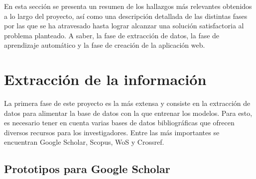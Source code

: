 

En esta sección se presenta un resumen de los hallazgos más relevantes obtenidos a lo largo del proyecto, así como una descripción detallada de las distintas fases por las que se ha atravesado hasta lograr alcanzar una solución satisfactoria al problema planteado. A saber, la fase de extracción de datos, la fase de aprendizaje automático y la fase de creación de la aplicación web.


\section{Extracción de la información}
La primera fase de este proyecto es la más extensa y consiste en la extracción de datos para alimentar la base de datos con la que entrenar los modelos. Para esto, es necesario tener en cuenta varias bases de datos bibliográficas que ofrecen diversos recursos para los investigadores. Entre las más importantes se encuentran Google Scholar, Scopus, WoS y Crossref.

\subsection{Prototipos para Google Scholar}

